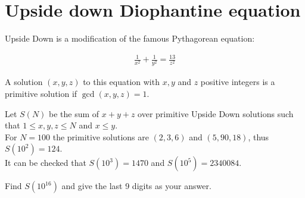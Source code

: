 \section[Problem \#748: Upside down Diophantine equation]{Upside down Diophantine equation}
\label{sec:problem_748}

Upside Down is a modification of the famous Pythagorean equation:

\begin{align}
\frac{1}{x^2}+\frac{1}{y^2}=\frac{13}{z^2}
\end{align}

A solution $(x,y,z)$ to this equation with
$x,y$ and $z$ positive integers is a
primitive solution if $\gcd(x,y,z)=1$.

Let $S(N)$ be the sum of $x+y+z$ over
primitive Upside Down solutions such that $1 \leq x,y,z \leq N$ and
$x \le y$.\\
For $N=100$ the primitive solutions are
$(2,3,6)$ and $(5,90,18)$, thus
$S(10^2)=124$.\\
It can be checked that $S(10^3)=1470$ and $S(10^5)=2340084$.

Find $S(10^{16})$ and give the last 9 digits as your answer.